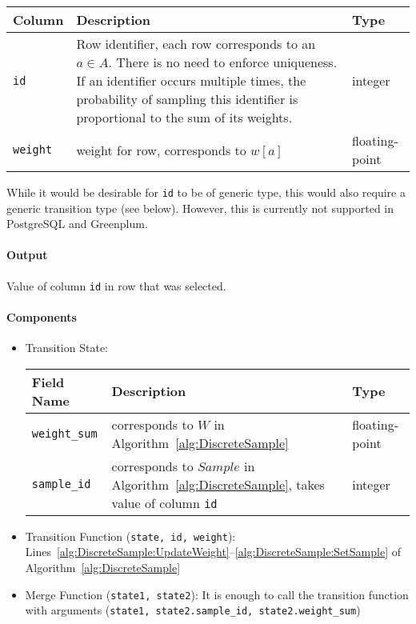 \documentclass[letterpaper,11pt]{scrreprt}
\numberwithin{equation}{section}
\newcommand{\otoprule}{\midrule[\heavyrulewidth]}
\theoremstyle{algorithm}
\newcommand{\Sample}{\mathit{Sample}}
\begin{document}
\begin{center}
	\begin{tabularx}{\linewidth}{lXl}
		\toprule%
		\textbf{Column} & \textbf{Description} & \textbf{Type}
		\\\otoprule
		\texttt{id} &
		Row identifier, each row corresponds to an $a \in A$. There is no need to enforce uniqueness. If an identifier occurs multiple times, the probability of sampling this identifier is proportional to the sum of its weights. &
		integer
		\\\midrule
		\texttt{weight} &
		weight for row, corresponds to $w[a]$ &
		floating-point
		\\\bottomrule
	\end{tabularx}
\end{center}
%
While it would be desirable for \texttt{id} to be of generic type, this would also require a generic transition type (see below). However, this is currently not supported in PostgreSQL and Greenplum.

\paragraph{Output}

Value of column \texttt{id} in row that was selected.

\paragraph{Components}

\begin{itemize}
	\item Transition State:
		\begin{center}
			\begin{tabularx}{\linewidth}{lXl}
				\toprule%
				\textbf{Field Name} & \textbf{Description} & \textbf{Type}
				\\\otoprule
				\texttt{weight\_sum} &
				corresponds to $W$ in Algorithm~\ref{alg:DiscreteSample} &
				floating-point
				\\\midrule
				\texttt{sample\_id} &
				corresponds to $\Sample$ in Algorithm~\ref{alg:DiscreteSample}, takes value of column \texttt{id} &
				integer
				\\\bottomrule
			\end{tabularx}
		\end{center}
	\item Transition Function (\texttt{state, id, weight}): Lines~\ref{alg:DiscreteSample:UpdateWeight}--\ref{alg:DiscreteSample:SetSample} of Algorithm~\ref{alg:DiscreteSample}
	\item Merge Function (\texttt{state1, state2}): It is enough to call the transition function with arguments (\texttt{state1, state2.sample\_id, state2.weight\_sum})
\end{itemize}
\end{document}
